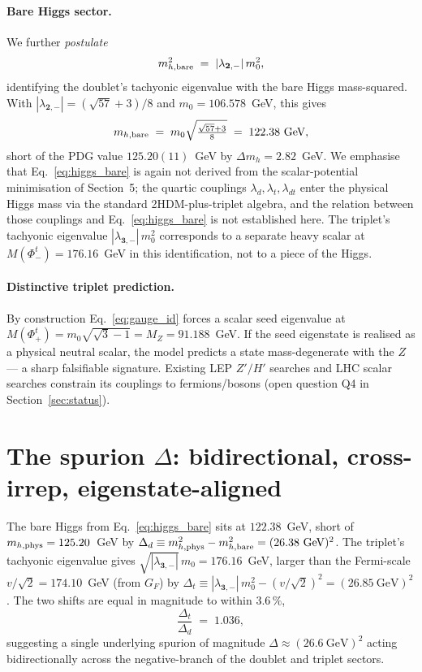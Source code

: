 \documentclass[11pt,a4paper]{article}
\newcommand{\md}{\mathbf{2}}
\newcommand{\mt}{\mathbf{3}}
\begin{document}
\paragraph{Bare Higgs sector.} We further \emph{postulate}
\begin{equation}
  m_{h,{\rm bare}}^2 \;=\; |\lambda_{\md,-}|\, m_0^2,
\label{eq:higgs_bare}
\end{equation}
identifying the doublet's tachyonic eigenvalue with the bare Higgs
mass-squared. With $|\lambda_{\md,-}| = (\sqrt{57}+3)/8$ and
$m_0 = 106.578$~GeV, this gives
\begin{equation}
  m_{h,{\rm bare}} \;=\; m_0 \sqrt{\tfrac{\sqrt{57}+3}{8}} \;=\; 122.38~\text{GeV},
\end{equation}
short of the PDG value $125.20(11)$~GeV by $\Delta m_h = 2.82$~GeV. We
emphasise that Eq.~\eqref{eq:higgs_bare} is again not derived from the
scalar-potential minimisation of Section~5; the quartic couplings
$\lambda_d, \lambda_t, \lambda_{dt}$ enter the physical Higgs mass via
the standard 2HDM-plus-triplet algebra, and the relation between those
couplings and Eq.~\eqref{eq:higgs_bare} is not established here. The
triplet's tachyonic eigenvalue $|\lambda_{\mt,-}|\,m_0^2$ corresponds to
a separate heavy scalar at $M(\Phi^t_-) = 176.16$~GeV in this
identification, not to a piece of the Higgs.

\paragraph{Distinctive triplet prediction.} By construction
Eq.~\eqref{eq:gauge_id} forces a scalar seed eigenvalue at
$M(\Phi^t_+) = m_0 \sqrt{\sqrt{3}-1} = M_Z = 91.188$~GeV. If the seed
eigenstate is realised as a physical neutral scalar, the model predicts a
state mass-degenerate with the $Z$ --- a sharp falsifiable signature.
Existing LEP $Z'/H'$ searches and LHC scalar searches constrain its
couplings to fermions/bosons (open question Q4 in
Section~\ref{sec:status}).

\section{The spurion $\Delta$: bidirectional, cross-irrep, eigenstate-aligned}
\label{sec:spurion}

The bare Higgs from Eq.~\eqref{eq:higgs_bare} sits at $122.38$~GeV,
short of $m_{h,{\rm phys}} = 125.20$~GeV by $\Delta_d \equiv
m_{h,{\rm phys}}^2 - m_{h,{\rm bare}}^2 = (26.38~\text{GeV})^2$. The
triplet's tachyonic eigenvalue gives $\sqrt{|\lambda_{\mt,-}|}\,m_0 =
176.16$~GeV, larger than the Fermi-scale $v/\sqrt{2} = 174.10$~GeV
(from $G_F$) by $\Delta_t \equiv |\lambda_{\mt,-}|\,m_0^2 - (v/\sqrt{2})^2
= (26.85~\text{GeV})^2$. The two shifts are equal in magnitude to within
$3.6\,\%$,
\[
  \frac{\Delta_t}{\Delta_d} \;=\; 1.036,
\]
suggesting a single underlying spurion of magnitude $\Delta \approx
(26.6~\text{GeV})^2$ acting bidirectionally across the negative-branch
of the doublet and triplet sectors.
\end{document}
